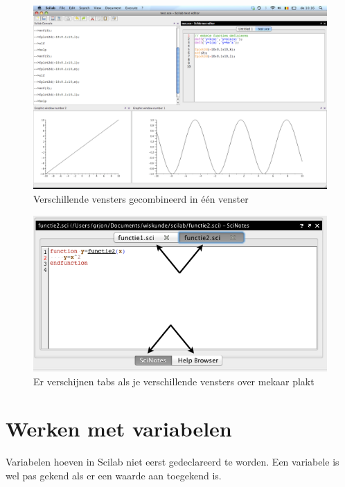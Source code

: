 \begin{figure}[h!t]
   \begin{center}
    \includegraphics[width=\textwidth]{figuren/scilab/06verschillendevensters.pdf}
  \caption{Verschillende vensters gecombineerd in één venster}
	\label{fig:verschillendevensters}
	\end{center}
\end{figure}

\begin{figure}[htbp]
\centering
\includegraphics[width=\textwidth]{figuren/scilab/06bverschillendevensters}
\caption{Er verschijnen tabs als je verschillende vensters over mekaar plakt}
\label{fig:06bverschillendevensters}
\end{figure}

\section{Werken met variabelen}
Variabelen hoeven in Scilab niet eerst gedeclareerd te worden. Een variabele is wel pas gekend als er een waarde aan toegekend is.

